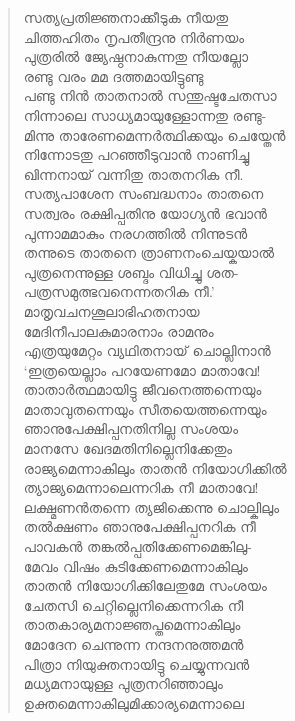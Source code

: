\begin{verse}
സത്യപ്രതിജ്ഞനാക്കീടുക നീയതു\\
ചിത്തഹിതം നൃപതീന്ദ്രനു നിര്‍ണയം\\
പുത്രരില്‍ ജ്യേഷ്ഠനാകുന്നതു നീയല്ലോ\\
രണ്ടു വരം മമ ദത്തമായിട്ടുണ്ടു\\
പണ്ടു നിന്‍ താതനാല്‍ സന്തുഷ്ടചേതസാ\\
നിന്നാലെ സാധ്യമായുള്ളോന്നതു രണ്ടു-\\
മിന്നു താരേണമെന്നര്‍ത്ഥിക്കയും ചെയ്തേന്‍\\
നിന്നോടതു പറഞ്ഞീടുവാന്‍ നാണിച്ചു\\
ഖിന്നനായ് വന്നിതു താതനറിക നീ.\\
സത്യപാശേന സംബദ്ധനാം താതനെ\\
സത്വരം രക്ഷിപ്പതിനു യോഗ്യന്‍ ഭവാന്‍\\
പുന്നാമമാകും നരഗത്തില്‍ നിന്നുടന്‍\\
തന്നുടെ താതനെ ത്രാണനംചെയ്കയാല്‍\\
പുത്രനെന്നുള്ള ശബ്ദം വിധിച്ചു ശത-\\
പത്രസമുത്ഭവനെന്നതറിക നീ.’\\
മാതൃവചനശൂലാഭിഹതനായ\\
മേദിനീപാലകുമാരനാം രാമനും\\
എത്രയുമേറ്റം വ്യഥിതനായ് ചൊല്ലിനാന്‍\\
‘ഇത്രയെല്ലാം പറയേണമോ മാതാവേ!\\
താതാര്‍ത്ഥമായിട്ടു ജീവനെത്തന്നെയും\\
മാതാവുതന്നെയും സീതയെത്തന്നെയും\\
ഞാനുപേക്ഷിപ്പനതിനില്ല സംശയം\\
മാനസേ ഖേദമതിനില്ലെനിക്കേതും\\
രാജ്യമെന്നാകിലും താതന്‍ നിയോഗിക്കില്‍\\
ത്യാജ്യമെന്നാലെന്നറിക നീ മാതാവേ!\\
ലക്ഷ്മണന്‍തന്നെ ത്യജിക്കെന്നു ചൊല്കിലും\\
തല്‍ക്ഷണം ഞാനുപേക്ഷിപ്പനറിക നീ\\
പാവകന്‍ തങ്കല്‍പ്പതിക്കേണമെങ്കിലു-\\
മേവം വിഷം കുടിക്കേണമെന്നാകിലും\\
താതന്‍ നിയോഗിക്കിലേതുമേ സംശയം\\
ചേതസി ചെറ്റില്ലെനിക്കെന്നറിക നീ\\
താതകാര്യമനാജ്ഞപ്തമെന്നാകിലും\\
മോദേന ചെന്നുന്ന നന്ദനനുത്തമന്‍\\
പിത്രാ നിയുക്തനായിട്ടു ചെയ്യുന്നവന്‍\\
മധ്യമനായുള്ള പുത്രനറിഞ്ഞാലും\\
ഉക്തമെന്നാകിലുമിക്കാര്യമെന്നാലെ\\

\end{verse}
